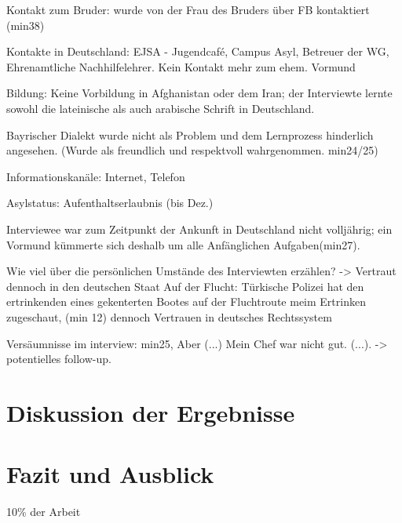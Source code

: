 \documentclass[12pt,oneside]{article}
\begin{document}
Kontakt zum Bruder: wurde von der Frau des Bruders über FB kontaktiert (min38)

Kontakte in Deutschland: EJSA - Jugendcafé, Campus Asyl, Betreuer der WG, Ehrenamtliche Nachhilfelehrer. Kein Kontakt mehr zum ehem. Vormund

Bildung: Keine Vorbildung in Afghanistan oder dem Iran; der Interviewte lernte sowohl die lateinische als auch arabische Schrift in Deutschland.

Bayrischer Dialekt wurde nicht als Problem und dem Lernprozess hinderlich angesehen. (Wurde als freundlich und respektvoll wahrgenommen. min24/25)

Informationskanäle: Internet, Telefon

Asylstatus: Aufenthaltserlaubnis (bis Dez.)

Interviewee war zum Zeitpunkt der Ankunft in Deutschland nicht volljährig; ein Vormund kümmerte sich deshalb um alle Anfänglichen Aufgaben(min27).

Wie viel über die persönlichen Umstände des Interviewten erzählen? -> Vertraut dennoch in den deutschen Staat
Auf der Flucht: Türkische Polizei hat den ertrinkenden eines gekenterten Bootes auf der Fluchtroute meim Ertrinken zugeschaut, (min 12) dennoch Vertrauen in deutsches Rechtssystem

Versäumnisse im interview: min25, Aber (...) Mein Chef war nicht gut. (...).
                -> potentielles follow-up.

\section{Diskussion der Ergebnisse}

\section{Fazit und Ausblick}

10\% der Arbeit

\clearpage
\lhead{}
\printbibliography
{}


\end{document}
